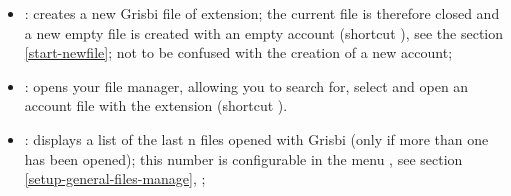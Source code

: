 \noindent
\begin{minipage}{.7\linewidth}
	\begin{itemize}[rightmargin=.6cm]
	\item {}: creates a new Grisbi file of \gls{extension}; the current file is therefore closed and a new empty file is created with an empty account (shortcut ), see the section \vref{start-newfile}; not to be confused with the creation of a new account;%
	\item {}: opens your file manager, allowing you to search for, select and open an account file with the  \gls{extension} (shortcut ).%
	\item {}: displays a list of the last n files opened with Grisbi (only if more than one has been opened); this number is configurable in the menu , see section \vref{setup-general-files-manage}, ;%
	\end{itemize}
\end{minipage}
\hspace{10pt}	
